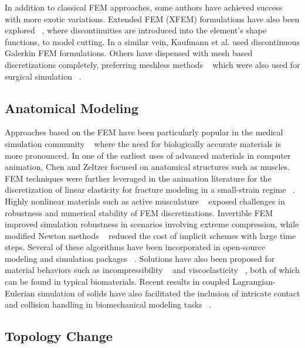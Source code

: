 In addition to classical FEM approaches, some authors have
achieved success with more exotic variations. Extended FEM (XFEM)
formulations have also been explored ~\citep{JerabK:2009}, where
discontinuities are introduced into the element's shape functions, to
model cutting. In a similar vein, Kaufmann et al.\!
 used discontinuous Galerkin FEM
formulations. Others have dispensed with mesh based discretizations
completely, preferring meshless methods ~\citep{DeB:2000} which were
also used for surgical simulation ~\citep{DeKLS:2005}.

\subsection{Anatomical Modeling}
Approaches based on the FEM have been particularly popular in the
medical simulation community ~\citep{MarchADC:2008} where the need for
biologically accurate materials is more pronounced. In one of the
earliest uses of advanced materials in computer animation, Chen and
Zeltzer  focused on anatomical structures such
as muscles. FEM techniques were further leveraged in the animation
literature for the discretization of linear elasticity for fracture
modeling in a small-strain regime ~\citep{OBriH:1999}. Highly
nonlinear materials such as active musculature ~\citep{TeranBHF:2003}
exposed challenges in robustness and numerical stability of FEM
discretizations. Invertible FEM ~\citep{IrvinTF:2004} improved
simulation robustness in scenarios involving extreme compression,
while modified Newton methods ~\citep{TeranSIF:2005} reduced the cost
of implicit schemes with large time steps. Several of these algorithms
have been incorporated in open-source modeling and simulation packages
~\citep{SinSB:2013}. Solutions have also been proposed for material
behaviors such as incompressibility ~\citep{IrvinSF:2007} and
viscoelasticity ~\citep{GokteBO:2004,WojtaT:2008}, both of which can
be found in typical biomaterials.  Recent results in coupled
Lagrangian-Eulerian simulation of solids have also facilitated the
inclusion of intricate contact and collision handling in biomechanical
modeling tasks ~\citep{SuedaKP:2008,LiSNP:2013,FanLP:2014}.

\subsection{Topology Change}


